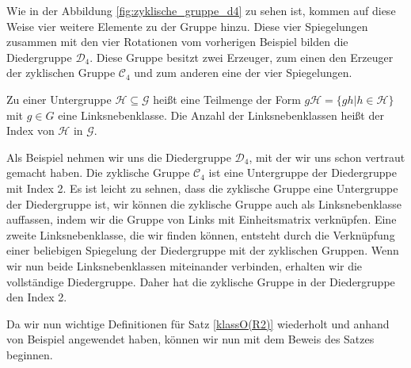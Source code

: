 Wie in der Abbildung \ref{fig:zyklische_gruppe_d4} zu sehen ist, kommen auf diese Weise vier weitere Elemente zu der Gruppe hinzu. Diese vier Spiegelungen zusammen mit den vier Rotationen vom vorherigen Beispiel bilden die Diedergruppe $\mathcal{D}_4$. Diese Gruppe besitzt zwei Erzeuger, zum einen den Erzeuger der zyklischen Gruppe $\mathcal{C}_4$ und zum anderen eine der vier Spiegelungen. 
\begin{defi}[Linksnebenklasse]
	Zu einer Untergruppe $\mathcal{H} \subseteq \mathcal{G}$ heißt eine Teilmenge der Form $g\mathcal{H} = \{gh|h\in\mathcal{H}\}$ mit $g \in G$ eine Linksnebenklasse. Die Anzahl der Linksnebenklassen heißt der Index von $\mathcal{H}$ in $\mathcal{G}$.
\end{defi}
Als Beispiel nehmen wir uns die Diedergruppe $\mathcal{D}_4$, mit der wir uns schon vertraut gemacht haben. Die zyklische Gruppe $\mathcal{C}_4$ ist eine Untergruppe der Diedergruppe mit Index 2. Es ist leicht zu sehnen, dass die zyklische Gruppe eine Untergruppe der Diedergruppe ist, wir können die zyklische Gruppe auch als Linksnebenklasse auffassen, indem wir die Gruppe von Links mit Einheitsmatrix verknüpfen. Eine zweite Linksnebenklasse, die wir finden können, entsteht durch die Verknüpfung einer beliebigen Spiegelung der Diedergruppe mit der zyklischen Gruppen. Wenn wir nun beide Linksnebenklassen miteinander verbinden, erhalten wir die vollständige Diedergruppe. Daher hat die zyklische Gruppe in der Diedergruppe den Index 2. \par\smallskip
Da wir nun wichtige Definitionen für Satz \ref{klassO(R2)} wiederholt und anhand von Beispiel angewendet haben, können wir nun mit dem Beweis des Satzes beginnen.
